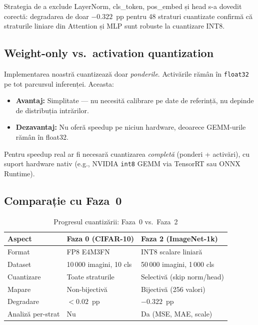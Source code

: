\documentclass[12pt,a4paper]{article}
\begin{document}
Strategia de a exclude LayerNorm, cls\_token, pos\_embed și head
s-a dovedit corectă: degradarea de doar $-0.322$~pp pentru 48 straturi
cuantizate confirmă că straturile liniare din Attention și MLP sunt
robuste la cuantizare INT8.

\subsection{Weight-only vs.\ activation quantization}

Implementarea noastră cuantizează doar \emph{ponderile}. Activările
rămân în \texttt{float32} pe tot parcursul inferenței. Aceasta:
\begin{itemize}
  \item \textbf{Avantaj:} Simplitate --- nu necesită calibrare pe date
    de referință, nu depinde de distribuția intrărilor.
  \item \textbf{Dezavantaj:} Nu oferă speedup pe niciun hardware,
    deoarece GEMM-urile rămân în float32.
\end{itemize}

Pentru speedup real ar fi necesară cuantizarea \emph{completă} (ponderi
+ activări), cu suport hardware nativ (e.g., NVIDIA \texttt{int8} GEMM
via TensorRT sau ONNX Runtime).

\subsection{Comparație cu Faza~0}

\begin{table}[H]
  \centering
  \caption{Progresul cuantizării: Faza~0 vs.\ Faza~2}
  \begin{tabular}{lll}
    \toprule
    \textbf{Aspect} & \textbf{Faza 0 (CIFAR-10)} & \textbf{Faza 2 (ImageNet-1k)} \\
    \midrule
    Format              & FP8 E4M3FN             & INT8 scalare liniară \\
    Dataset             & 10\,000 imagini, 10 cls & 50\,000 imagini, 1\,000 cls \\
    Cuantizare          & Toate straturile        & Selectivă (skip norm/head) \\
    Mapare              & Non-bijectivă           & Bijectivă (256 valori) \\
    Degradare           & $<0.02$~pp              & $-0.322$~pp \\
    Analiză per-strat   & Nu                      & Da (MSE, MAE, scale) \\
    \bottomrule
  \end{tabular}
  \label{tab:faza0_vs_faza2}
\end{table}
\end{document}
